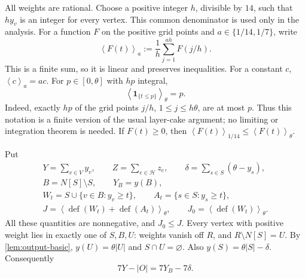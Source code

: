\documentclass[11pt,a4paper]{article}
\theoremstyle{definition}
\theoremstyle{remark}
\DeclareMathOperator{\Def}{def}
\newcommand{\HH}{\mathcal H}
\newcommand{\ind}{\mathbf 1}
\newcommand{\avg}[2]{\left\langle #1\right\rangle_{#2}}
\begin{document}
All weights are rational. Choose a positive integer \(h\), divisible by
\(14\), such that \(hy_v\) is an integer for every vertex. This common
denominator is used only in the analysis. For a function \(F\) on the
positive grid points and \(a\in\{1/14,1/7\}\), write
\begin{equation}\label{eq:level-average}
 \avg{F(t)}{a}:=\frac1h\sum_{j=1}^{ah}F(j/h).
\end{equation}
This is a finite sum, so it is linear and preserves inequalities.
For a constant \(c\), \(\avg{c}{a}=ac\). For
\(p\in[0,\theta]\) with \(hp\) integral,
\begin{equation}\label{eq:layer-cake}
 \avg{\ind_{\{t\leq p\}}}{\theta}=p.
\end{equation}
Indeed, exactly \(hp\) of the grid points \(j/h\), \(1\leq j\leq h\theta\),
are at most \(p\). Thus this notation is a finite version of the usual
layer-cake argument; no limiting or integration theorem is needed.
If \(F(t)\geq0\), then
\(\avg{F(t)}{1/14}\leq\avg{F(t)}{\theta}\).

Put
\begin{equation}\label{eq:rounding-quantities}
 \begin{gathered}
 Y=\sum_{v\in V}y_v,\qquad Z=\sum_{e\in\HH}z_e,\qquad
 \delta=\sum_{s\in S}(\theta-y_s),\\
 B=N[S]\setminus S,\qquad Y_B=y(B),\\
 W_t=S\cup\{v\in B:y_v\geq t\},\qquad
 A_t=\{s\in S:y_s\geq t\},\\
 J=\avg{\Def(W_t)+\Def(A_t)}{\theta},\qquad
 J_0=\avg{\Def(W_t)}{\theta}.
 \end{gathered}
\end{equation}
All these quantities are nonnegative, and \(J_0\leq J\).
Every vertex with positive weight lies in exactly one of \(S,B,U\):
weights vanish off \(R\), and \(R\setminus N[S]=U\). By
\cref{lem:output-basic}, \(y(U)=\theta|U|\) and \(S\cap U=\varnothing\).
Also \(y(S)=\theta|S|-\delta\). Consequently
\begin{equation}\label{eq:mass-identity}
 7Y-|O|=7Y_B-7\delta.
\end{equation}
\end{document}
